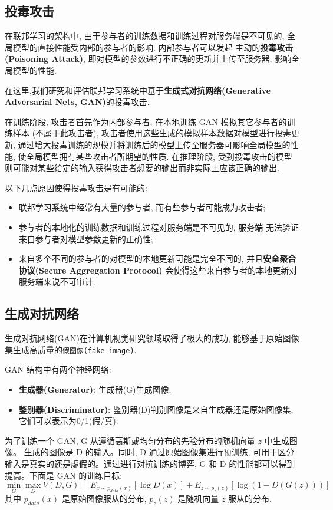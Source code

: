 \documentclass[../main.tex]{subfiles}
\begin{document}
\subsection{投毒攻击}
在联邦学习的架构中, 由于参与者的训练数据和训练过程对服务端是不可见的,
全局模型的直接性能受内部的参与者的影响. 内部参与者可以发起
主动的\textbf{投毒攻击(Poisoning Attack)}, 即对模型的参数进行不正确的更新并上传至服务器, 影响全局模型的性能.

在这里,我们研究和评估联邦学习系统中基于\textbf{生成式对抗网络(Generative
Adversarial Nets, GAN)}的投毒攻击.

在训练阶段, 攻击者首先作为内部参与者, 在本地训练 GAN 模拟其它参与者的训练样本
(不属于此攻击者), 攻击者使用这些生成的模拟样本数据对模型进行投毒更新,
通过增大投毒训练的规模并将训练后的模型上传至服务器可影响全局模型的性能,
使全局模型拥有某些攻击者所期望的性质. 在推理阶段, 受到投毒攻击的模型
则可能对某些给定的输入获得攻击者想要的输出而非实际上应该正确的输出.

以下几点原因使得投毒攻击是有可能的:
\begin{itemize}
  \item 联邦学习系统中经常有大量的参与者, 而有些参与者可能成为攻击者;
  \item 参与者的本地化的训练数据和训练过程对服务端是不可见的, 服务端
    无法验证来自参与者对模型参数更新的正确性;
  \item 来自多个不同的参与者的对模型的本地更新可能是完全不同的,
    并且\textbf{安全聚合协议(Secure Aggregation Protocol)}
    会使得这些来自参与者的本地更新对服务端来说不可审计.
\end{itemize}
%
\subsection{生成对抗网络}
生成对抗网络(GAN)在计算机视觉研究领域取得了极大的成功,
能够基于原始图像集生成高质量的\texttt{假图像(fake image)}.

GAN 结构中有两个神经网络:
\begin{itemize}
  \item \textbf{生成器(Generator)}: 生成器(G)生成图像.
  \item \textbf{鉴别器(Discriminator)}:
    鉴别器(D)判别图像是来自生成器还是原始图像集,
    它们可以表示为0/1(假/真).
\end{itemize}
%
为了训练一个 GAN, G 从遵循高斯或均匀分布的先验分布的随机向量 $ z $ 中生成图像。
生成的图像是 D 的输入。同时, D 通过原始图像集进行预训练,
可用于区分输入是真实的还是虚假的。通过进行对抗训练的博弈,
G 和 D 的性能都可以得到提高。下面是 GAN 的训练目标:
\begin{equation}
  \min_G\max_D V(D, G) = E_{x\sim p_{data}(x)}[\log D(x)]
  + E_{z\sim p_{z}(z)}[\log(1 - D(G(z)))]
\end{equation}
其中 $ p_{data}(x) $ 是原始图像服从的分布, $ p_z(z) $ 是随机向量 $ z $
服从的分布.
%
\end{document}
